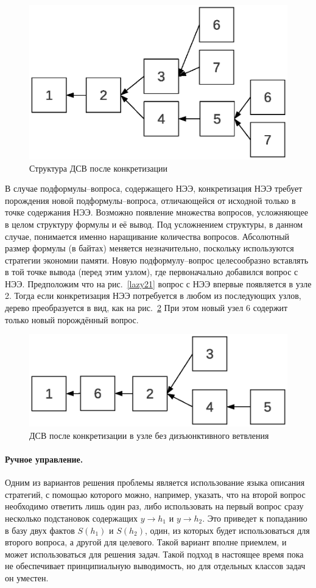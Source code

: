 \begin{figure}[h]
	\centering
	\includegraphics[width=0.5\linewidth]{pics/Lazy22.eps}
	\caption{Структура ДСВ после конкретизации}
	\label{lazy22}
\end{figure}

В случае подформулы--вопроса, содержащего НЭЭ, конкретизация НЭЭ требует порождения новой подформулы--вопроса, отличающейся от исходной только в точке содержания НЭЭ. Возможно появление множества вопросов, усложняющее в целом структуру формулы и её вывод. Под усложнением структуры, в данном случае, понимается именно наращивание количества вопросов. Абсолютный размер формулы (в байтах) меняется незначительно, поскольку используются стратегии экономии памяти. Новую подформулу--вопрос целесообразно вставлять в той точке вывода (перед этим узлом), где первоначально добавился вопрос с НЭЭ. Предположим что на рис.~\ref{lazy21} вопрос с НЭЭ впервые появляется в узле 2. Тогда если конкретизация НЭЭ потребуется в любом из последующих узлов, дерево преобразуется в вид, как на рис.~\ref{lazy23} При этом новый узел 6 содержит только новый порождённый вопрос.
\begin{figure}[h]
	\centering
	\includegraphics[width=0.5\linewidth]{pics/Lazy23.eps}
	\caption{ДСВ после конкретизации в узле без дизъюнктивного ветвления}
	\label{lazy23}
\end{figure}

\paragraph{Ручное управление.}
Одним из вариантов решения проблемы является использование языка описания стратегий, с помощью которого можно, например, указать, что на второй вопрос необходимо ответить лишь один раз, либо использовать на первый вопрос сразу несколько подстановок содержащих $y\rightarrow h_1$ и $y\rightarrow h_2$. Это приведет к попаданию в базу двух фактов $S(h_1)$ и $S(h_2)$, один, из которых будет использоваться для второго вопроса, а другой для целевого. Такой вариант вполне приемлем, и может использоваться для решения задач. Такой подход в настоящее время пока не обеспечивает принципиальную выводимость, но для отдельных классов задач он уместен.

